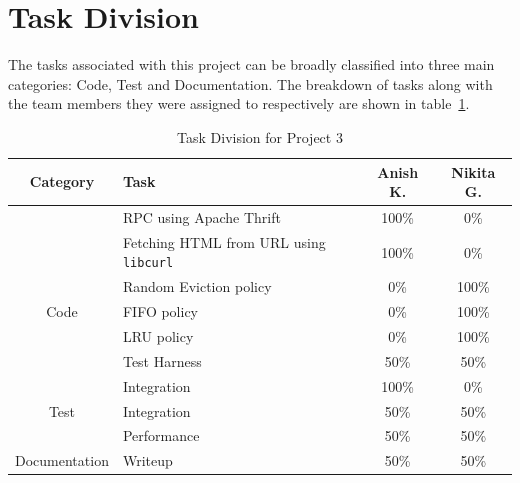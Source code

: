 \documentclass[11pt,pdftex,twocolumn]{article}
\begin{document}
\section{Task Division}
The tasks associated with this project can be broadly classified into three main categories: Code, Test and Documentation. The breakdown of tasks along with the team members they were assigned to respectively are shown in table~\ref{tab:taskDiv}.
\begin{table}[t]
\centering
\begin{tabular}{| c | p{3.5in} | c | c |}
\hline
Category & Task & Anish K. & Nikita G.\\
\hline\hline
& RPC using Apache Thrift & 100\% & 0\%\\
\cline{2-4}
& Fetching HTML from URL using \texttt{libcurl} & 100\% & 0\%\\
\cline{2-4}
& Random Eviction policy & 0\% & 100\%\\
\cline{2-4}
Code & FIFO policy & 0\% & 100\%\\
\cline{2-4}
& LRU policy & 0\% & 100\%\\
\cline{2-4}
& Test Harness & 50\% & 50\%\\
\cline{2-4}
& Integration & 100\% & 0\%\\
\hline
Test & Integration & 50\% & 50\%\\
\cline{2-4}
& Performance & 50\% & 50\%\\
\hline
Documentation & Writeup & 50\% & 50\%\\
\hline
\end{tabular}
\caption{Task Division for Project 3}
\label{tab:taskDiv}
\end{table}
\end{document}
